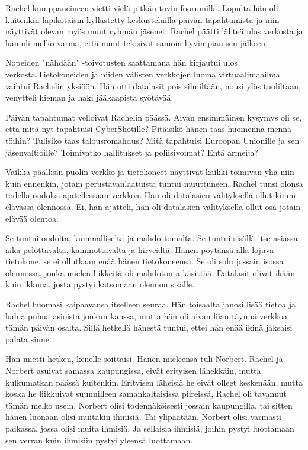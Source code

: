\psep Rachel kumppaneineen vietti vielä pitkän tovin foorumilla. Lopulta hän oli kuitenkin läpikotaisin kyllästetty keskusteluilla päivän tapahtumista ja niin näyttivät olevan myös muut ryhmän jäsenet. Rachel päätti lähteä ulos verkosta ja hän oli melko varma, että muut tekisivät samoin hyvin pian sen jälkeen.


Nopeiden "nähdään" -toivotusten saattamana hän kirjautui ulos verkosta.Tietokoneiden ja niiden välisten verkkojen luoma virtuaalimaailma vaihtui Rachelin yksiöön. Hän otti datalasit pois silmiltään, nousi ylös tuoliltaan, venytteli hieman ja haki jääkaapista syötävää.




\psep Päivän tapahtumat velloivat Rachelin päässä. Aivan ensimmäinen kysymys oli se, että mitä nyt tapahtuisi CyberShotille? Pitäisikö hänen taas huomenna mennä töihin? Tulisiko taas talousromahdus? Mitä tapahtuisi Euroopan Unionille ja sen jäsenvaltioille? Toimivatko hallitukset ja poliisivoimat? Entä armeija?


Vaikka päällisin puolin verkko ja tietokoneet näyttivät kaikki toimivan yhä niin kuin ennenkin, jotain perustavanlaatuista tuntui muuttuneen. Rachel tunsi olonsa todella oudoksi ajatellessaan verkkoa. Hän oli datalasien välityksellä ollut kiinni elävässä olennossa. Ei, hän ajatteli, hän oli datalasien välityksellä ollut osa jotain elävää olentoa.


Se tuntui oudolta, kummalliselta ja mahdottomalta. Se tuntui sisällä itse asiassa aika pelottavalta, kammottavalta ja hirveältä. Hänen pöytänsä alla lojuva tietokone, se ei ollutkaan enää hänen tietokoneensa. Se oli solu jossain isossa olennossa, jonka mielen liikkeitä oli mahdotonta käsittää. Datalasit olivat ikään kuin ikkuna, josta pystyi katsomaan olennon sisälle.




\psep Rachel huomasi kaipaavansa itselleen seuraa. Hän toisaalta janosi lisää tietoa ja halua puhua asioista jonkun kanssa, mutta hän oli aivan liian täynnä verkkoa tämän päivän osalta. Sillä hetkellä hänestä tuntui, ettei hän enää ikinä jaksaisi palata sinne.


Hän mietti hetken, kenelle soittaisi. Hänen mieleensä tuli Norbert. Rachel ja Norbert asuivat samassa kaupungissa, eivät erityisen lähekkäin, mutta kulkumatkan päässä kuitenkin. Erityisen läheisiä he eivät olleet keskenään, mutta koska he liikkuivat suunnilleen samankaltaisissa piireissä, Rachel oli tavannut tämän melko usein. Norbert olisi todennäköisesti jossain kaupungilla, tai sitten hänen luonaan olisi muitakin ihmisiä. Tai ylipäätään, Norbert olisi varmasti paikassa, jossa olisi muita ihmisiä. Ja sellaisia ihmisiä, joihin pystyi luottamaan sen verran kuin ihmisiin pystyi yleensä luottamaan.


